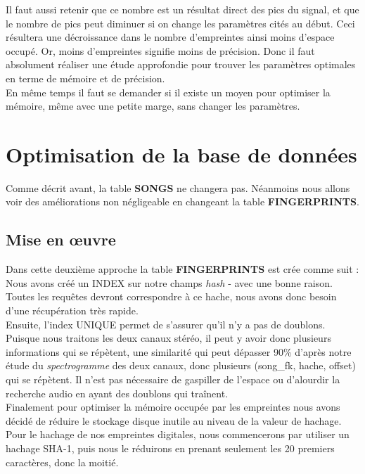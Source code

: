 \documentclass[11pt, report, french]{scrreprt}
\begin{document}
Il faut aussi retenir que ce nombre est un résultat direct des pics du signal, et que le nombre de pics peut diminuer si on change les paramètres cités au début. Ceci résultera une décroissance dans le nombre d'empreintes ainsi moins d'espace occupé. Or, moins d'empreintes signifie moins de précision. Donc il faut absolument réaliser une étude approfondie pour trouver les paramètres optimales en terme de mémoire et de précision.\\
En même temps il faut se demander si il existe un moyen pour optimiser la mémoire, même avec une petite marge, sans changer les paramètres.


\section{Optimisation de la base de données}
Comme décrit avant, la table \textbf{SONGS} ne changera pas. Néanmoins nous allons voir des améliorations non négligeable en changeant la table \textbf{FINGERPRINTS}.

\subsection{Mise en œuvre}
Dans cette deuxième approche la table \textbf{FINGERPRINTS} est crée comme suit : \\



\vspace{0.5cm}
Nous avons créé un INDEX sur notre champs \textit{hash} - avec une bonne raison. Toutes les requêtes devront correspondre à ce hache, nous avons donc besoin d'une récupération très rapide.\\

Ensuite, l'index UNIQUE permet de s'assurer qu'il n'y a pas de doublons.
Puisque nous traitons les deux canaux stéréo, il peut y avoir donc plusieurs informations qui se répètent, une similarité qui peut dépasser 90\% d'après notre étude du \textit{spectrogramme} des deux canaux, donc plusieurs (song\_fk, hache, offset) qui se répètent. Il n'est pas nécessaire de gaspiller de l'espace ou d'alourdir la recherche audio en ayant des doublons qui traînent.\\

Finalement pour optimiser la mémoire occupée par les empreintes nous avons décidé de réduire le stockage disque inutile au niveau de la valeur de hachage. Pour le hachage de nos empreintes digitales, nous commencerons par utiliser un hachage SHA-1, puis nous le réduirons en prenant seulement les 20 premiers caractères, donc la moitié.\\
\end{document}
